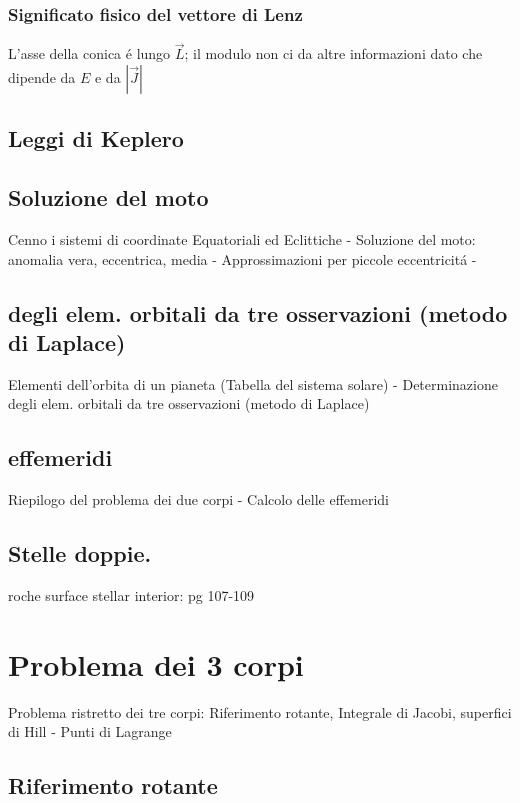 \subsection{Significato fisico del vettore di Lenz}

L'asse della conica \'e lungo $\vec{L}$; il modulo non ci da altre informazioni dato che dipende da $E$ e da $|\vec{J}|$ 



\section{Leggi di Keplero}



\section{Soluzione del moto}
Cenno i sistemi di coordinate Equatoriali ed Eclittiche - Soluzione del moto: anomalia vera, eccentrica, media - Approssimazioni per piccole eccentricit\'a - 

\section{ degli elem. orbitali da tre osservazioni (metodo di Laplace) }
Elementi dell'orbita di un pianeta (Tabella del sistema solare) - Determinazione degli elem. orbitali da tre osservazioni (metodo di Laplace) 

\section{effemeridi}
Riepilogo del problema dei due corpi - Calcolo delle effemeridi


\section{Stelle doppie.}
\begin{todo}{roche surface}
stellar interior: pg 107-109
\end{todo}


\chapter{Problema dei 3 corpi}


Problema ristretto dei tre corpi: Riferimento rotante, Integrale di Jacobi, superfici di Hill - Punti di Lagrange 
\PartialToc

\section{Riferimento rotante}

